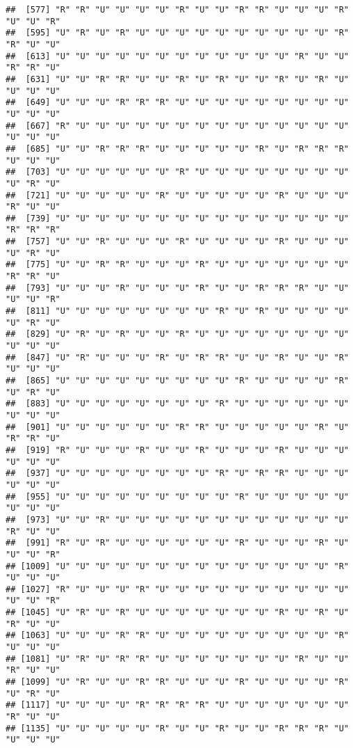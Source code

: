 \documentclass[
]{article}
\begin{document}
\begin{verbatim}
##  [577] "R" "R" "U" "U" "U" "U" "R" "U" "U" "R" "R" "U" "U" "U" "R" "U" "U" "R"
##  [595] "U" "R" "U" "R" "U" "U" "U" "U" "U" "U" "U" "U" "U" "U" "R" "R" "U" "U"
##  [613] "U" "U" "U" "U" "U" "U" "U" "U" "U" "U" "U" "U" "R" "U" "U" "R" "R" "U"
##  [631] "U" "U" "R" "R" "U" "U" "R" "U" "R" "U" "U" "R" "U" "R" "U" "U" "U" "U"
##  [649] "U" "U" "U" "R" "R" "R" "U" "U" "U" "U" "U" "U" "U" "U" "U" "U" "U" "U"
##  [667] "R" "U" "U" "U" "U" "U" "U" "U" "U" "U" "U" "U" "U" "U" "U" "U" "U" "U"
##  [685] "U" "U" "R" "R" "R" "U" "U" "U" "U" "U" "R" "U" "R" "R" "R" "U" "U" "U"
##  [703] "U" "U" "U" "U" "U" "U" "R" "U" "U" "U" "U" "U" "U" "U" "U" "U" "R" "U"
##  [721] "U" "U" "U" "U" "U" "R" "U" "U" "U" "U" "U" "R" "U" "U" "U" "R" "U" "U"
##  [739] "U" "U" "U" "U" "U" "U" "U" "U" "U" "U" "U" "U" "U" "U" "U" "R" "R" "R"
##  [757] "U" "U" "R" "U" "U" "U" "R" "U" "U" "U" "U" "R" "U" "U" "U" "U" "R" "U"
##  [775] "U" "U" "R" "R" "U" "U" "U" "R" "U" "U" "U" "U" "U" "U" "U" "R" "R" "U"
##  [793] "U" "U" "U" "R" "U" "U" "U" "R" "U" "U" "R" "R" "R" "U" "U" "U" "U" "R"
##  [811] "U" "U" "U" "U" "U" "U" "U" "U" "R" "U" "R" "U" "U" "U" "U" "U" "R" "U"
##  [829] "U" "R" "U" "R" "U" "U" "R" "U" "U" "U" "U" "U" "U" "U" "U" "U" "U" "U"
##  [847] "U" "R" "U" "U" "U" "R" "U" "R" "R" "U" "U" "R" "U" "U" "R" "U" "U" "U"
##  [865] "U" "U" "U" "U" "U" "U" "U" "U" "U" "R" "U" "U" "U" "U" "R" "U" "R" "U"
##  [883] "U" "U" "U" "U" "U" "U" "U" "U" "R" "U" "U" "U" "U" "U" "U" "U" "U" "U"
##  [901] "U" "U" "U" "U" "U" "U" "R" "R" "U" "U" "U" "U" "U" "R" "U" "R" "R" "U"
##  [919] "R" "U" "U" "U" "R" "U" "U" "R" "U" "U" "U" "R" "U" "U" "U" "U" "U" "U"
##  [937] "U" "U" "U" "U" "U" "U" "U" "U" "R" "U" "R" "R" "U" "U" "U" "U" "U" "U"
##  [955] "U" "U" "U" "U" "U" "U" "U" "U" "U" "R" "U" "U" "U" "U" "U" "U" "U" "U"
##  [973] "U" "U" "R" "U" "U" "U" "U" "U" "U" "U" "U" "U" "U" "U" "U" "R" "U" "U"
##  [991] "R" "U" "R" "U" "U" "U" "U" "U" "U" "R" "U" "U" "U" "R" "U" "U" "U" "R"
## [1009] "U" "U" "U" "U" "U" "U" "U" "U" "U" "U" "U" "U" "U" "U" "R" "U" "U" "U"
## [1027] "R" "U" "U" "U" "R" "U" "U" "U" "U" "U" "U" "U" "U" "U" "U" "U" "U" "R"
## [1045] "U" "R" "U" "R" "U" "U" "U" "U" "U" "U" "U" "R" "U" "R" "U" "R" "U" "U"
## [1063] "U" "U" "U" "R" "R" "U" "U" "U" "U" "U" "U" "U" "U" "U" "R" "U" "U" "U"
## [1081] "U" "R" "U" "R" "R" "U" "U" "U" "U" "U" "U" "U" "R" "U" "U" "R" "U" "U"
## [1099] "U" "R" "U" "U" "R" "R" "U" "U" "U" "R" "U" "U" "U" "U" "R" "U" "R" "U"
## [1117] "U" "U" "U" "U" "R" "R" "R" "R" "U" "U" "U" "U" "U" "U" "U" "R" "U" "U"
## [1135] "U" "U" "U" "U" "U" "R" "U" "U" "R" "U" "U" "R" "R" "R" "U" "U" "U" "U"

\end{verbatim}
\end{document}
